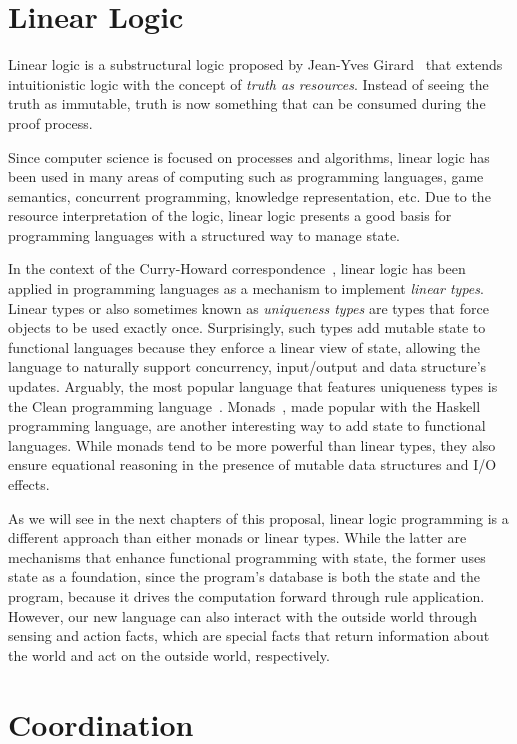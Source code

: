 \section{Linear Logic}

Linear logic is a substructural logic proposed by Jean-Yves Girard~\cite{Girard95logic:its} that extends intuitionistic logic with the concept of \emph{truth as resources}. Instead of seeing the truth as immutable, truth is now something that can be consumed during the proof process.

Since computer science is focused on processes and algorithms, linear logic has been used
in many areas of computing such as programming languages, game semantics, concurrent programming, knowledge representation, etc.
Due to the resource interpretation of the logic, linear logic presents a good basis for programming
languages with a structured way to manage state.

In the context of the Curry-Howard correspondence~\cite{howard:tfatnoc}, linear logic has been applied in programming languages
as a mechanism to implement \emph{linear types}. Linear types or also sometimes known as \emph{uniqueness types} are types
that force objects to be used exactly once. Surprisingly, such types add mutable state to functional languages because they enforce
a linear view of state, allowing the language to naturally support concurrency, input/output and data structure's updates.
Arguably, the most popular language that features uniqueness types is the Clean programming language~\cite{JFP:1349748}.
Monads~\cite{Wadler:1997:DI:262009.262011}, made popular with the Haskell programming language, are another interesting way to add state
to functional languages. While monads tend to be more powerful than linear types, they also ensure equational reasoning in the presence
of mutable data structures and I/O effects.

As we will see in the next chapters of this proposal, linear logic programming is a different approach than either monads or linear types.
While the latter are mechanisms that enhance functional programming with state, the former uses state as a foundation, since
the program's database is both the state and the program, because it drives the computation forward through rule application. However, our
new language can also interact with the outside world through sensing and action facts, which are special facts that return information
about the world and act on the outside world, respectively.

\section{Coordination}

